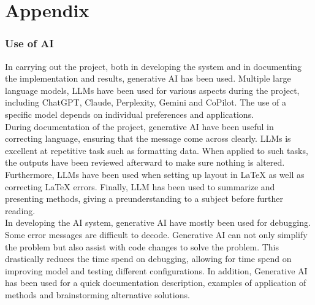 \chapter{Appendix}\label{cha:appendix}

\subsection{Use of AI}
In carrying out the project, both in developing the system and in documenting the implementation and results, generative AI has been used. Multiple large language models, LLMs have been used for various aspects during the project, including ChatGPT, Claude, Perplexity, Gemini and CoPilot. The use of a specific model depends on individual preferences and applications.
\\
During documentation of the project, generative AI have been useful in correcting language, ensuring that the message come across clearly. LLMs is excellent at repetitive task such as formatting data. When applied to such tasks, the outputs have been reviewed afterward to make sure nothing is altered. Furthermore, LLMs have been used when setting up layout in LaTeX as well as correcting LaTeX errors. Finally, LLM has been used to summarize and presenting methods, giving a preunderstanding to a subject before further reading.
\\
In developing the AI system, generative AI have mostly been used for debugging. Some error messages are difficult to decode. Generative AI can not only simplify the problem but also assist with code changes to solve the problem. This drastically reduces the time spend on debugging, allowing for time spend on improving model and testing different configurations. In addition, Generative AI has been used for a quick documentation description, examples of application of methods and brainstorming alternative solutions. 
